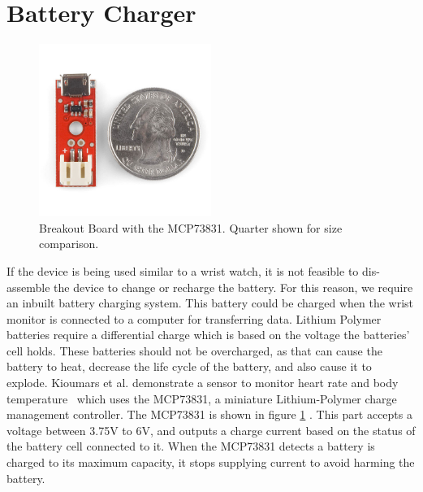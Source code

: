 \section{Battery Charger}
\label{Sec:BattCharger}
\begin{figure}
\begin{center}
\includegraphics[width=0.5\textwidth]{images/MCP73Breakout.jpg}
\caption{Breakout Board with the MCP73831. Quarter shown for size comparison.}
\label{Fig:MCPCharger}
\end{center}
\end{figure}
If the device is being used similar to a wrist watch,
it is not feasible to dis-assemble the device to change or recharge the battery.
For this reason, 
we require an inbuilt battery charging system.
This battery could be charged when the wrist monitor is connected to a computer for transferring data.
Lithium Polymer batteries require a differential charge which is based on the voltage the batteries' cell holds.
These batteries should not be overcharged, 
as that can cause the battery to heat,
decrease the life cycle of the battery,
and also cause it to explode.
Kioumars et al. demonstrate a sensor to monitor heart rate and body temperature~\cite{kioumars2011atmega}
which uses the MCP73831, a miniature Lithium-Polymer charge management controller.
The MCP73831 is shown in figure \ref{Fig:MCPCharger} \cite{Web:MCPIC}.
This part accepts a voltage between 3.75V to 6V,
and outputs a charge current based on the status of the battery cell connected to it.
When the MCP73831 detects a battery is charged to its maximum capacity,
it stops supplying current to avoid harming the battery.

